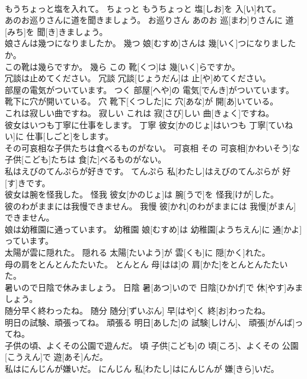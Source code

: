 \documentclass[8pt]{extreport}
\begin{document}
\begin{CJK}{UTF8}{min}
\\	もうちょっと塩を入れて。	ちょっと	もうちょっと 塩[しお]を 入[い]れて。	
\\	あのお巡りさんに道を聞きましょう。	お巡りさん	あのお 巡[まわ]りさんに 道[みち]を 聞[き]きましょう。	
\\	娘さんは幾つになりましたか。	幾つ	娘[むすめ]さんは 幾[いく]つになりましたか。	
\\	この靴は幾らですか。	幾ら	この 靴[くつ]は 幾[いく]らですか。	
\\	冗談は止めてください。	冗談	冗談[じょうだん]は 止[や]めてください。	
\\	部屋の電気がついています。	つく	部屋[へや]の 電気[でんき]がついています。	
\\	靴下に穴が開いている。	穴	靴下[くつした]に 穴[あな]が 開[あ]いている。	
\\	これは寂しい曲ですね。	寂しい	これは 寂[さび]しい 曲[きょく]ですね。	
\\	彼女はいつも丁寧に仕事をします。	丁寧	彼女[かのじょ]はいつも 丁寧[ていねい]に 仕事[しごと]をします。	
\\	その可哀相な子供たちは食べるものがない。	可哀相	その 可哀相[かわいそう]な 子供[こども]たちは 食[た]べるものがない。	
\\	私はえびのてんぷらが好きです。	てんぷら	私[わたし]はえびのてんぷらが 好[す]きです。	
\\	彼女は腕を怪我した。	怪我	彼女[かのじょ]は 腕[うで]を 怪我[けが]した。	
\\	彼のわがままには我慢できません。	我慢	彼[かれ]のわがままには 我慢[がまん]できません。	
\\	娘は幼稚園に通っています。	幼稚園	娘[むすめ]は 幼稚園[ようちえん]に 通[かよ]っています。	
\\	太陽が雲に隠れた。	隠れる	太陽[たいよう]が 雲[くも]に 隠[かく]れた。	
\\	母の肩をとんとんたたいた。	とんとん	母[はは]の 肩[かた]をとんとんたたいた。	
\\	暑いので日陰で休みましょう。	日陰	暑[あつ]いので 日陰[ひかげ]で 休[やす]みましょう。	
\\	随分早く終わったね。	随分	随分[ずいぶん] 早[はや]く 終[お]わったね。	
\\	明日の試験、頑張ってね。	頑張る	明日[あした]の 試験[しけん]、 頑張[がんば]ってね。	
\\	子供の頃、よくその公園で遊んだ。	頃	子供[こども]の 頃[ころ]、よくその 公園[こうえん]で 遊[あそ]んだ。	
\\	私はにんじんが嫌いだ。	にんじん	私[わたし]はにんじんが 嫌[きら]いだ。	

\end{CJK}
\end{document}
